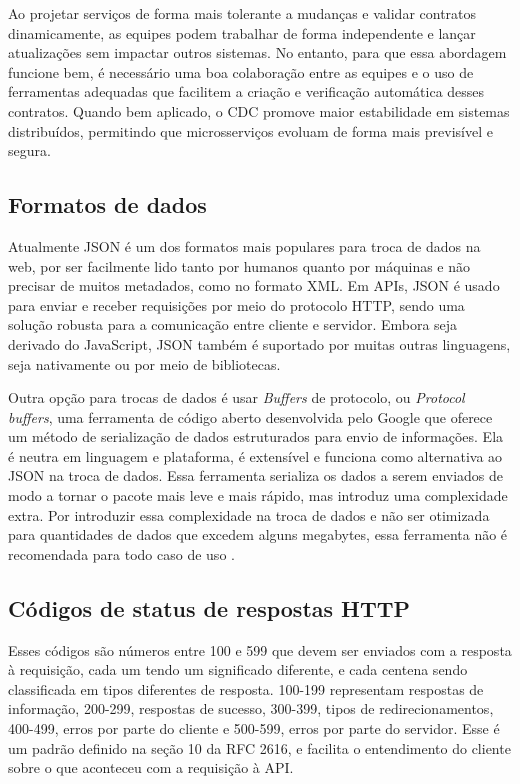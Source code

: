 Ao projetar serviços de forma mais tolerante a mudanças e validar contratos dinamicamente, as equipes podem trabalhar de forma independente e lançar atualizações sem impactar outros sistemas. No entanto, para que essa abordagem funcione bem, é necessário uma boa colaboração entre as equipes e o uso de ferramentas adequadas que facilitem a criação e verificação automática desses contratos. Quando bem aplicado, o CDC promove maior estabilidade em sistemas distribuídos, permitindo que microsserviços evoluam de forma mais previsível e segura. \cite{consumer-driven-contracts}

\subsection{Formatos de dados}\label{subsecao-trocas-de-dados}
Atualmente JSON é um dos formatos mais populares para troca de dados na web, por ser facilmente lido tanto por humanos quanto por máquinas e não precisar de muitos metadados, como no formato XML. Em APIs, JSON é usado para enviar e receber requisições por meio do protocolo HTTP, sendo uma solução robusta para a comunicação entre cliente e servidor. Embora seja derivado do JavaScript, JSON também é suportado por muitas outras linguagens, seja nativamente ou por meio de bibliotecas. \cite{json_bourhis_2020}

Outra opção para trocas de dados é usar \emph{Buffers} de protocolo, ou \emph{Protocol buffers}, uma ferramenta de código aberto desenvolvida pelo Google que oferece um método de serialização de dados estruturados para envio de informações. Ela é neutra em linguagem e plataforma, é extensível e funciona como alternativa ao JSON na troca de dados. Essa ferramenta serializa os dados a serem enviados de modo a tornar o pacote mais leve e mais rápido, mas introduz uma complexidade extra. Por introduzir essa complexidade na troca de dados e não ser otimizada para quantidades de dados que excedem alguns megabytes, essa ferramenta não é recomendada para todo caso de uso \cite{google-protocol-buffers}.

\subsection{Códigos de status de respostas HTTP}
Esses códigos são números entre 100 e 599 que devem ser enviados com a resposta à requisição, cada um tendo um significado diferente, e cada centena sendo classificada em tipos diferentes de resposta. 100-199 representam respostas de informação, 200-299, respostas de sucesso, 300-399, tipos de redirecionamentos, 400-499, erros por parte do cliente e 500-599, erros por parte do servidor. Esse é um padrão definido na seção 10 da RFC 2616, e facilita o entendimento do cliente sobre o que aconteceu com a requisição à API. \cite{rfc_http_nielsen_1999, api-design-restfulapi}


